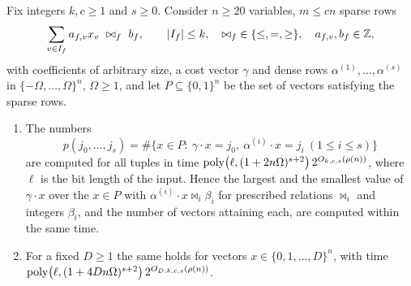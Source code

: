 \begin{theorem}\label{thm:ip}
Fix integers $k,c\ge1$ and $s\ge0$. Consider $n\ge20$ variables, $m\le cn$
sparse rows
\[
  \sum_{v\in I_f}a_{f,v}x_v\ \bowtie_f\ b_f,\qquad |I_f|\le k,\quad
  {\bowtie_f}\in\{\le,=,\ge\},\quad a_{f,v},b_f\in\Z,
\]
with coefficients of arbitrary size, a cost vector $\gamma$ and dense rows
$\alpha^{(1)},\dots,\alpha^{(s)}$ in $\{-\Omega,\dots,\Omega\}^n$, $\Omega\ge1$,
and let $P\subseteq\{0,1\}^n$ be the set of vectors satisfying the sparse rows.
\begin{enumerate}[label=\textup{(\roman*)},leftmargin=2.2em]
\item\label{it:ip01} The numbers
\[
  p(j_0,\dots,j_s)=\#\bigl\{x\in P:\ \gamma\cdot x=j_0,\ \alpha^{(i)}\cdot x=j_i\ (1\le i\le s)\bigr\}
\]
are computed for all tuples in time
$\operatorname{poly}\bigl(\ell,(1+2n\Omega)^{s+2}\bigr)\,2^{O_{k,c,s}(\rho(n))}$, where $\ell$
is the bit length of the input. Hence the largest and the smallest value of
$\gamma\cdot x$ over the $x\in P$ with $\alpha^{(i)}\cdot x\bowtie_i\beta_i$ for
prescribed relations $\bowtie_i$ and integers $\beta_i$, and the number of
vectors attaining each, are computed within the same time.
\item\label{it:ipD} For a fixed $D\ge1$ the same holds for vectors
$x\in\{0,1,\dots,D\}^n$, with time
$\operatorname{poly}\bigl(\ell,(1+4Dn\Omega)^{s+2}\bigr)\,2^{O_{D,k,c,s}(\rho(n))}$.
\end{enumerate}
\end{theorem}


